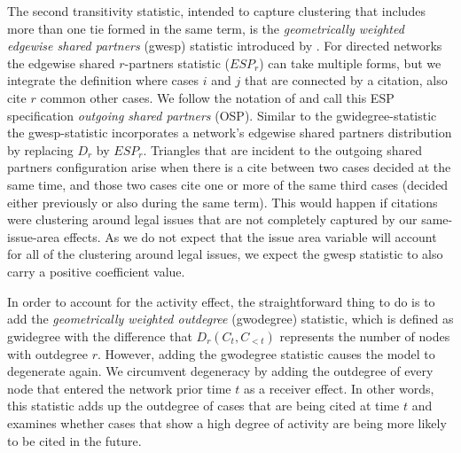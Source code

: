 \documentclass[headsepline=true, abstracton]{scrartcl}
\begin{document}
The second transitivity statistic, intended to capture clustering that includes more than one tie formed in the same term, is the \textit{geometrically weighted edgewise shared partners} (gwesp) statistic introduced by \citet{hunter2006inference}. For directed networks the edgewise shared $r$-partners statistic ($ESP_r$) can take multiple forms, but we integrate the definition where cases $i$ and $j$ that are connected by a citation, also cite $r$ common other cases. We follow the notation of \citet{Butts.2008} and call this ESP specification \textit{outgoing shared partners} (OSP). Similar to the gwidegree-statistic the gwesp-statistic incorporates a network's edgewise shared partners distribution by replacing $D_r$ by $ESP_r$. Triangles that are incident to the outgoing shared partners configuration arise when there is a cite between two cases decided at the same time, and those two cases cite one or more of the same third cases (decided either previously or also during the same term). This would happen if citations were clustering around legal issues that are not completely captured by our same-issue-area effects.  As we do not expect that the issue area variable will account for all of the clustering around legal issues, we expect the gwesp statistic to also carry a positive coefficient value.

In order to account for the activity effect, the straightforward thing to do is to add the \textit{geometrically weighted outdegree} (gwodegree) statistic, which is defined as gwidegree with the difference that $D_r(C_t, C_{<t})$ represents the number of nodes with outdegree $r$. However, adding the gwodegree statistic causes the model to degenerate again. We circumvent degeneracy by adding the outdegree of every node that entered the network prior time $t$ as a receiver effect. In other words, this statistic adds up the outdegree of cases that are being cited at time $t$ and examines whether cases that show a high degree of activity are being more likely to be cited in the future.








\end{document}
